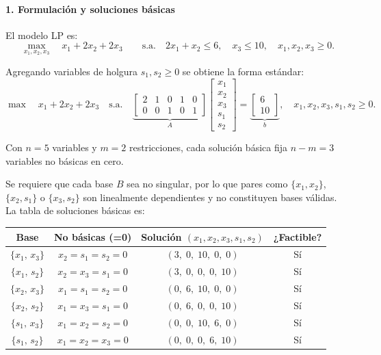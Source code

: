 \paragraph{1.\; Formulación y soluciones básicas}

El modelo LP es:
\begin{equation}
  \max_{x_1,x_2,x_3}\quad x_1 + 2x_2 + 2x_3
  \qquad \text{s.a.}\quad
  2x_1 + x_2 \le 6,\quad
  x_3 \le 10,\quad
  x_1,x_2,x_3 \ge 0.
  \label{ex:4:3:sol:eq:primal}
\end{equation}

Agregando variables de holgura $s_1,s_2\ge 0$ se obtiene la forma estándar:
\begin{equation}
  \max\quad x_1+2x_2+2x_3
  \quad\text{s.a.}\quad
  \underbrace{\begin{bmatrix}2&1&0&1&0\\0&0&1&0&1\end{bmatrix}}_{\displaystyle A}
  \begin{bmatrix}x_1\\x_2\\x_3\\s_1\\s_2\end{bmatrix}
  =
  \underbrace{\begin{bmatrix}6\\10\end{bmatrix}}_{\displaystyle b},\quad
  x_1,x_2,x_3,s_1,s_2\ge 0.
  \label{ex:4:3:sol:eq:std}
\end{equation}

Con $n=5$ variables y $m=2$ restricciones, cada solución básica fija $n-m=3$
variables no básicas en cero.

Se requiere que cada base $B$ sea no singular, por lo que pares como $\{x_1,x_2\}$, $\{x_2,s_1\}$ o $\{x_3,s_2\}$ son linealmente dependientes y no
constituyen bases válidas. La tabla de soluciones básicas es:

\begin{center}
\renewcommand{\arraystretch}{1.25}
\begin{tabular}{cccc}
  \toprule
  \textbf{Base} & \textbf{No básicas (=0)} &
  \textbf{Solución }$(x_1,x_2,x_3,s_1,s_2)$ & \textbf{¿Factible?} \\
  \midrule
  $\{x_1,\,x_3\}$ & $x_2=s_1=s_2=0$ & $(3,\;0,\;10,\;0,\;0)$  & Sí \\
  $\{x_1,\,s_2\}$ & $x_2=x_3=s_1=0$ & $(3,\;0,\;0,\;0,\;10)$  & Sí \\
  $\{x_2,\,x_3\}$ & $x_1=s_1=s_2=0$ & $(0,\;6,\;10,\;0,\;0)$  & Sí \\
  $\{x_2,\,s_2\}$ & $x_1=x_3=s_1=0$ & $(0,\;6,\;0,\;0,\;10)$  & Sí \\
  $\{s_1,\,x_3\}$ & $x_1=x_2=s_2=0$ & $(0,\;0,\;10,\;6,\;0)$  & Sí \\
  $\{s_1,\,s_2\}$ & $x_1=x_2=x_3=0$ & $(0,\;0,\;0,\;6,\;10)$  & Sí \\
  \bottomrule
\end{tabular}
\end{center}

